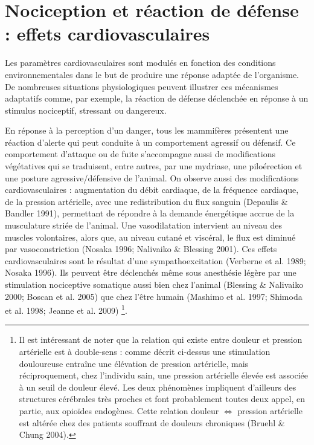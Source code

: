 \documentclass[a4paper,12pt,twoside]{report}
\begin{document}
\section{Nociception et réaction de défense : effets cardiovasculaires}

\label{Nociception,réaction de défense,effets cardiovasculaires}

Les paramètres cardiovasculaires sont modulés en fonction des conditions environnementales dans le but de produire une réponse adaptée de l’organisme. De nombreuses situations physiologiques peuvent illustrer ces mécanismes adaptatifs comme, par exemple, la réaction de défense déclenchée en réponse à un stimulus nociceptif, stressant ou dangereux. 

En réponse à la perception d’un danger, tous les mammifères présentent une réaction d’alerte qui peut conduite à un comportement agressif ou défensif. Ce comportement d’attaque ou de fuite s'accompagne aussi de modifications végétatives qui se traduisent, entre autres, par une mydriase, une piloérection et une posture agressive/défensive de l’animal. On observe aussi des modifications cardiovasculaires : augmentation du débit cardiaque, de la fréquence cardiaque, de la pression artérielle, avec une redistribution du flux sanguin (Depaulis \& Bandler 1991), permettant de répondre à la demande énergétique accrue de la musculature striée de l’animal. Une vasodilatation intervient au niveau des muscles volontaires, alors que, au niveau cutané et viscéral, le flux est diminué par vasoconstriction (Nosaka 1996; Nalivaiko \& Blessing 2001). Ces effets cardiovasculaires sont le résultat d’une sympathoexcitation (Verberne et al. 1989; Nosaka 1996). Ils peuvent être déclenchés même sous anesthésie légère par une stimulation nociceptive somatique aussi bien chez l’animal (Blessing \& Nalivaiko 2000; Boscan et al. 2005) que chez l’être humain (Mashimo et al. 1997; Shimoda et al. 1998; Jeanne et al. 2009)
\footnote{Il est intéressant de noter que la relation qui existe entre douleur et pression artérielle est à double-sens : comme décrit ci-dessus une stimulation douloureuse entraîne une élévation de pression artérielle, mais réciproquement, chez l’individu sain, une pression artérielle élevée est associée à un seuil de douleur élevé. Les deux phénomènes impliquent d’ailleurs des structures cérébrales très proches et font probablement toutes deux appel, en partie, aux opioïdes endogènes. Cette relation douleur $\Longleftrightarrow$ pression artérielle est altérée chez des patients souffrant de douleurs chroniques (Bruehl \& Chung 2004).}.
\end{document}

